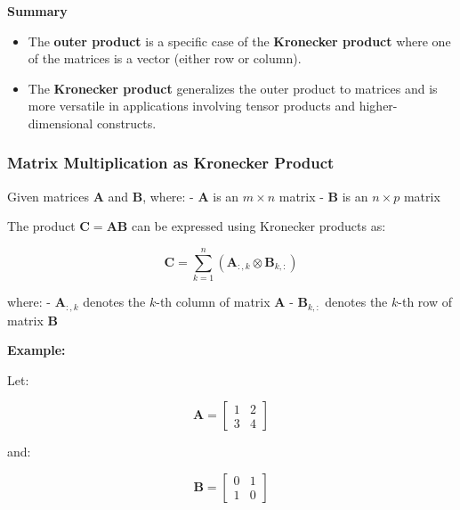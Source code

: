 \documentclass[
  letterpaper,
  DIV=11,
  numbers=noendperiod]{scrreprt}
\providecommand{\tightlist}{%
  \setlength{\itemsep}{0pt}\setlength{\parskip}{0pt}}\usepackage{longtable,booktabs,array}
\theoremstyle{plain}
\theoremstyle{definition}
\theoremstyle{remark}
\begin{document}
\begin{tcolorbox}[enhanced jigsaw, rightrule=.15mm, arc=.35mm, breakable, colback=white, toprule=.15mm, colframe=quarto-callout-note-color-frame, toptitle=1mm, opacityback=0, colbacktitle=quarto-callout-note-color!10!white, opacitybacktitle=0.6, title=\textcolor{quarto-callout-note-color}{\faInfo}\hspace{0.5em}{Note}, bottomrule=.15mm, left=2mm, titlerule=0mm, coltitle=black, bottomtitle=1mm, leftrule=.75mm]

\textbf{Summary}

\begin{itemize}
\tightlist
\item
  The \textbf{outer product} is a specific case of the \textbf{Kronecker
  product} where one of the matrices is a vector (either row or column).
\item
  The \textbf{Kronecker product} generalizes the outer product to
  matrices and is more versatile in applications involving tensor
  products and higher-dimensional constructs.
\end{itemize}

\end{tcolorbox}

\subsubsection{Matrix Multiplication as Kronecker
Product}\label{matrix-multiplication-as-kronecker-product}

Given matrices \(\mathbf{A}\) and \(\mathbf{B}\), where: -
\(\mathbf{A}\) is an \(m \times n\) matrix - \(\mathbf{B}\) is an
\(n \times p\) matrix

The product \(\mathbf{C} = \mathbf{A} \mathbf{B}\) can be expressed
using Kronecker products as:

\[\mathbf{C} = \sum_{k=1}^n (\mathbf{A}_{:,k} \otimes \mathbf{B}_{k,:})\]

where: - \(\mathbf{A}_{:,k}\) denotes the \(k\)-th column of matrix
\(\mathbf{A}\) - \(\mathbf{B}_{k,:}\) denotes the \(k\)-th row of matrix
\(\mathbf{B}\)

\textbf{Example:}

Let:

\[\mathbf{A} = \begin{bmatrix}1 & 2 \\3 & 4\end{bmatrix}\]

and:

\[\mathbf{B} = \begin{bmatrix}0 & 1 \\1 & 0\end{bmatrix}\]
\end{document}

